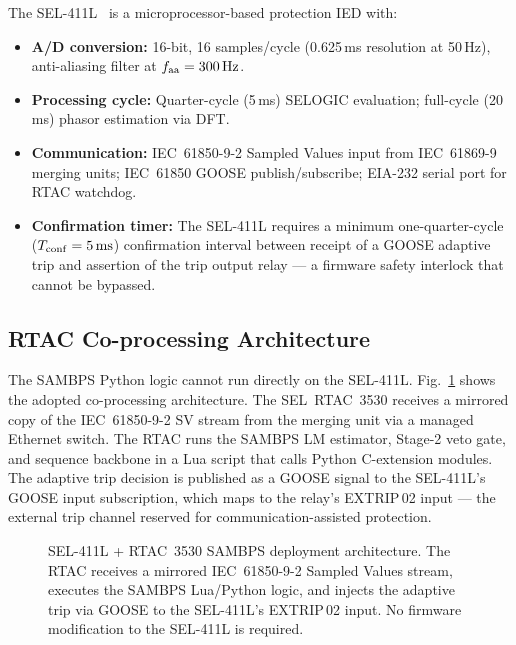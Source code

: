 \documentclass[journal,twoside]{IEEEtran}
\begin{document}
The SEL-411L~\cite{SEL411L} is a microprocessor-based protection IED with:
\begin{itemize}
  \item \textbf{A/D conversion:} 16-bit, 16 samples/cycle (0.625\,ms resolution
        at 50\,Hz), anti-aliasing filter at $f_{\rm aa} = 300\,\text{Hz}$.
  \item \textbf{Processing cycle:} Quarter-cycle (5\,ms) SELOGIC evaluation;
        full-cycle (20\,ms) phasor estimation via DFT.
  \item \textbf{Communication:} IEC~61850-9-2 Sampled Values input from
        IEC~61869-9 merging units; IEC~61850 GOOSE publish/subscribe; EIA-232
        serial port for RTAC watchdog.
  \item \textbf{Confirmation timer:} The SEL-411L requires a minimum
        one-quarter-cycle ($T_{\rm conf} = 5\,\text{ms}$) confirmation interval
        between receipt of a GOOSE adaptive trip and assertion of the trip
        output relay --- a firmware safety interlock that cannot be bypassed.
\end{itemize}

\subsection{RTAC Co-processing Architecture}

The SAMBPS Python logic cannot run directly on the SEL-411L.
Fig.~\ref{fig:architecture} shows the adopted co-processing architecture.
The SEL~RTAC~3530 receives a mirrored copy of the IEC~61850-9-2 SV stream
from the merging unit via a managed Ethernet switch.
The RTAC runs the SAMBPS LM estimator, Stage-2 veto gate, and sequence
backbone in a Lua script that calls Python C-extension modules.
The adaptive trip decision is published as a GOOSE signal to the SEL-411L's
GOOSE input subscription, which maps to the relay's EXTRIP\,02 input ---
the external trip channel reserved for communication-assisted protection.

\begin{figure}[t]
  \centering
  \resizebox{\columnwidth}{!}{}
  \caption{SEL-411L + RTAC~3530 SAMBPS deployment architecture.
    The RTAC receives a mirrored IEC~61850-9-2 Sampled Values stream,
    executes the SAMBPS Lua/Python logic, and injects the adaptive trip via
    GOOSE to the SEL-411L's EXTRIP\,02 input.
    No firmware modification to the SEL-411L is required.}
  \label{fig:architecture}
\end{figure}
\end{document}
